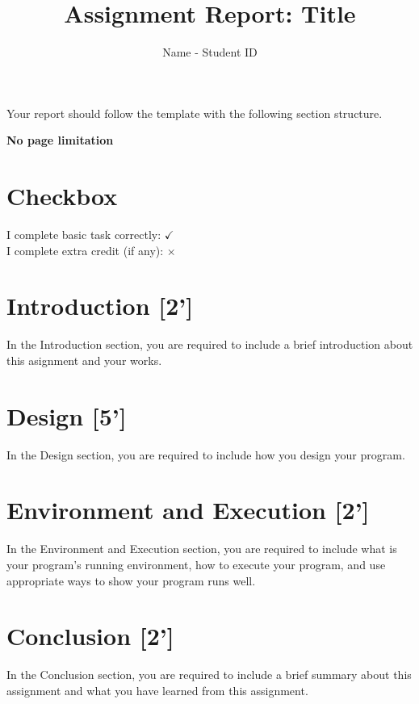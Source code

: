 \documentclass{article}
\title{Assignment Report: Title}
\author{Name - Student ID}
\begin{document}
\maketitle


Your report should follow the template with the following section structure.

\textbf{No page limitation}
\section*{Checkbox}
I complete basic task correctly: $\checkmark$ \\
I complete extra credit (if any): $\times$\\
\section{Introduction [2']}

In the Introduction section, you are required to include a brief introduction about this asignment and your works.


\section{Design [5']}

In the Design section, you are required to include how you design your program.

\section{Environment and Execution [2']}

In the Environment and Execution section, you are required to include what is your program's running environment, how to execute your program, and use appropriate ways to show your program runs well.

\section{Conclusion [2']}

In the Conclusion section, you are required to include a brief summary about this assignment and what you have learned from this assignment.
\end{document}

